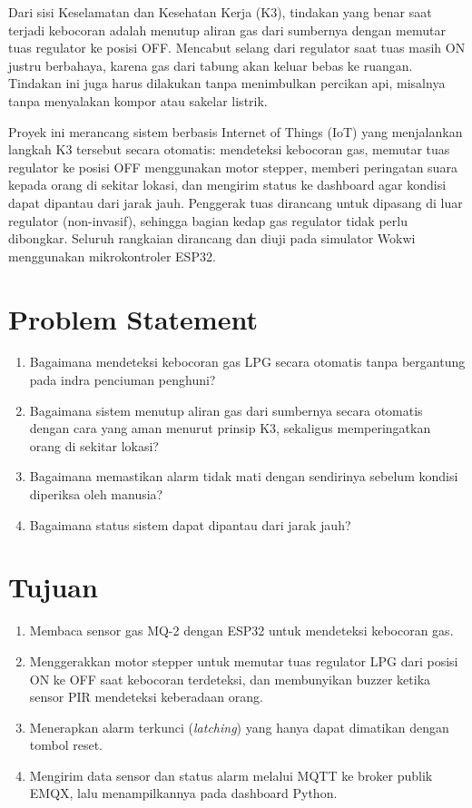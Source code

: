 \documentclass[12pt,a4paper,oneside]{report}
\begin{document}
Dari sisi Keselamatan dan Kesehatan Kerja (K3), tindakan yang benar saat terjadi kebocoran adalah menutup aliran gas dari sumbernya dengan memutar tuas regulator ke posisi OFF. Mencabut selang dari regulator saat tuas masih ON justru berbahaya, karena gas dari tabung akan keluar bebas ke ruangan. Tindakan ini juga harus dilakukan tanpa menimbulkan percikan api, misalnya tanpa menyalakan kompor atau sakelar listrik.

Proyek ini merancang sistem berbasis Internet of Things (IoT) yang menjalankan langkah K3 tersebut secara otomatis: mendeteksi kebocoran gas, memutar tuas regulator ke posisi OFF menggunakan motor stepper, memberi peringatan suara kepada orang di sekitar lokasi, dan mengirim status ke dashboard agar kondisi dapat dipantau dari jarak jauh. Penggerak tuas dirancang untuk dipasang di luar regulator (non-invasif), sehingga bagian kedap gas regulator tidak perlu dibongkar. Seluruh rangkaian dirancang dan diuji pada simulator Wokwi menggunakan mikrokontroler ESP32.

\section{Problem Statement}
\begin{enumerate}
  \item Bagaimana mendeteksi kebocoran gas LPG secara otomatis tanpa bergantung pada indra penciuman penghuni?
  \item Bagaimana sistem menutup aliran gas dari sumbernya secara otomatis dengan cara yang aman menurut prinsip K3, sekaligus memperingatkan orang di sekitar lokasi?
  \item Bagaimana memastikan alarm tidak mati dengan sendirinya sebelum kondisi diperiksa oleh manusia?
  \item Bagaimana status sistem dapat dipantau dari jarak jauh?
\end{enumerate}

\section{Tujuan}
\begin{enumerate}
  \item Membaca sensor gas MQ-2 dengan ESP32 untuk mendeteksi kebocoran gas.
  \item Menggerakkan motor stepper untuk memutar tuas regulator LPG dari posisi ON ke OFF saat kebocoran terdeteksi, dan membunyikan buzzer ketika sensor PIR mendeteksi keberadaan orang.
  \item Menerapkan alarm terkunci (\emph{latching}) yang hanya dapat dimatikan dengan tombol reset.
  \item Mengirim data sensor dan status alarm melalui MQTT ke broker publik EMQX, lalu menampilkannya pada dashboard Python.
\end{enumerate}
\end{document}
